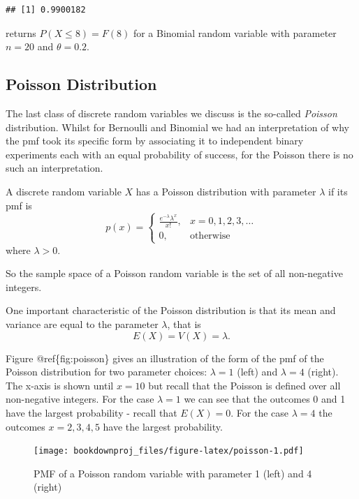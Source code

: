\documentclass[
]{book}
\begin{document}
\begin{verbatim}
## [1] 0.9900182
\end{verbatim}

returns \(P(X\leq 8) = F(8)\) for a Binomial random variable with parameter \(n=20\) and \(\theta = 0.2\).

\hypertarget{poisson-distribution}{%
\subsection{Poisson Distribution}\label{poisson-distribution}}

The last class of discrete random variables we discuss is the so-called \emph{Poisson} distribution. Whilst for Bernoulli and Binomial we had an interpretation of why the pmf took its specific form by associating it to independent binary experiments each with an equal probability of success, for the Poisson there is no such an interpretation.

A discrete random variable \(X\) has a Poisson distribution with parameter \(\lambda\) if its pmf is
\[
p(x)=\left\{
\begin{array}{ll}
\frac{e^{-\lambda}\lambda^x}{x!}, & x = 0,1,2,3,\dots\\
0, & \mbox{otherwise}
\end{array}
\right.
\]
where \(\lambda > 0\).

So the sample space of a Poisson random variable is the set of all non-negative integers.

One important characteristic of the Poisson distribution is that its mean and variance are equal to the parameter \(\lambda\), that is
\[
E(X)= V(X) = \lambda.
\]

Figure @ref\{fig:poisson\} gives an illustration of the form of the pmf of the Poisson distribution for two parameter choices: \(\lambda=1\) (left) and \(\lambda = 4\) (right). The x-axis is shown until \(x=10\) but recall that the Poisson is defined over all non-negative integers. For the case \(\lambda=1\) we can see that the outcomes 0 and 1 have the largest probability - recall that \(E(X)=0\). For the case \(\lambda = 4\) the outcomes \(x = 2,3,4,5\) have the largest probability.

\begin{figure}
\centering
\texttt{[image: bookdownproj\_files/figure-latex/poisson-1.pdf]}
\caption{\label{fig:poisson}PMF of a Poisson random variable with parameter 1 (left) and 4 (right)}
\end{figure}
\end{document}
